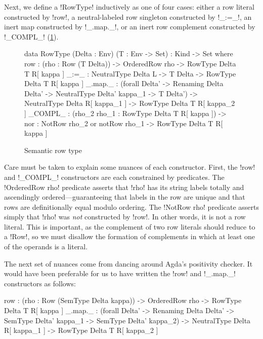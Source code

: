 \documentclass[sigplan,10pt,review]{acmart}\settopmatter{printfolios=true,printccs=false,printacmref=false}
\begin{document}
\Ni Next, we define a !RowType! inductively as one of four cases: either a row literal constructed by !row!, a neutral-labeled row singleton constructed by !_:=_!, an inert map constructed by !_.map._!, or an inert row complement constructed by !_COMPL_! (\cref{fig:semantic-rows}).
\begin{figure}
\begin{agda}
data RowType (Delta : Env) 
             (T : Env -> Set) : Kind -> Set where 
  row      : (rho : Row (T Delta)) -> 
              OrderedRow rho -> 
              RowType Delta T R[ kappa ]
  _:=_     : NeutralType Delta L -> 
             T Delta -> 
             RowType Delta T R[ kappa ]
  _.map._  : (forall {Delta'} -> 
                Renaming Delta Delta' -> 
                NeutralType Delta' kappa_1 -> 
                T Delta') -> 
             NeutralType Delta R[ kappa_1 ] -> 
             RowType Delta T R[ kappa_2 ]
  _COMPL_  : (rho_2  rho_1 : RowType Delta T R[ kappa ]) -> 
             {nor : NotRow rho_2  or  notRow rho_1} -> 
             RowType Delta T R[ kappa ]
\end{agda}
\caption{Semantic row type}
\label{fig:semantic-rows}
\end{figure}

Care must be taken to explain some nuances of each constructor. First, the !row! and !_COMPL_! constructors are each constrained by predicates. The !OrderedRow rho! predicate asserts that !rho! has its string labels totally and ascendingly ordered---guaranteeing that labels in the row are unique and that rows are definitionally equal modulo ordering. The !NotRow rho! predicate asserts simply that !rho! was \emph{not} constructed by !row!. In other words, it is not a row literal. This is important, as the complement of two row literals should reduce to a !Row!, so we must disallow the formation of complements in which at least one of the operands is a literal. 

The next set of nuances come from dancing around Agda's positivity checker. It would have been preferable for us to have written the !row! and !_.map._! constructors as follows: 
\begin{agda}
  row      : (rho : Row (SemType Delta kappa)) -> 
             OrderedRow rho -> 
             RowType Delta T R[ kappa ]
  _.map._  : (forall {Delta'} -> 
                Renaming Delta Delta' -> 
                SemType Delta' kappa_1 -> 
                SemType Delta' kappa_2) -> 
             NeutralType Delta R[ kappa_1 ] -> 
             RowType Delta T R[ kappa_2 ]
\end{agda}
\end{document}
